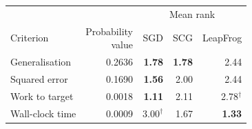 \begin{tabular}{@{}l r rrr@{}}
\toprule
& & \multicolumn{3}{c}{Mean rank} \\\cmidrule(l){3-5}Criterion & \shortstack{Probability\\value} & SGD & SCG & LeapFrog \\
\midrule
Generalisation & 0.2636 & \textbf{1.78} & \textbf{1.78} & 2.44 \\
Squared error & 0.1690 & \textbf{1.56} & 2.00 & 2.44 \\
Work to target & 0.0018 & \textbf{1.11} & 2.11 & 2.78$^\dagger$ \\
Wall-clock time & 0.0009 & 3.00$^\dagger$ & 1.67 & \textbf{1.33} \\
\bottomrule
\end{tabular}
